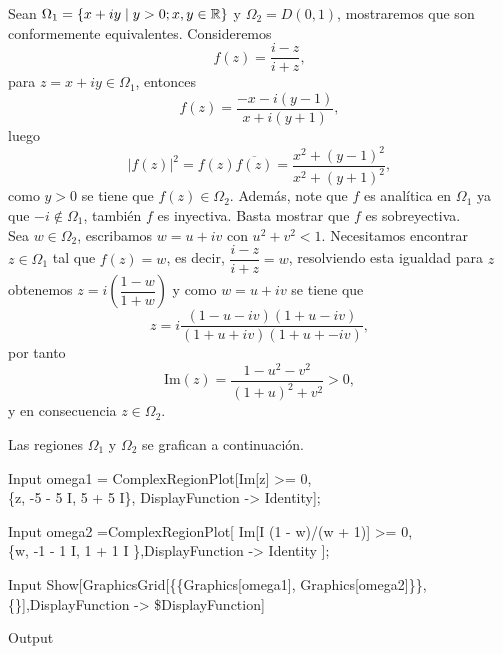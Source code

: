 
\begin{Ejem}\label{ejemplo1}
	Sean $\Omega_{1}=\{x+iy\mid y>0;x,y\in \mathbb{R}\}$ y $\Omega_{2}=D(0,1)$, mostraremos que son conformemente equivalentes. Consideremos 
	$$f(z)=\dfrac{i-z}{i+z},$$
	para $z=x+iy\in\Omega_{1}$, entonces 
	$$f(z)=\dfrac{-x-i(y-1)}{x+i(y+1)},$$
	luego
	$$|f(z)|^2=f(z)\overline{f(z)}=\dfrac{x^2+(y-1)^2}{x^2+(y+1)^2},$$
	como $y>0$ se tiene que $f(z)\in\Omega_{2}$. Además, note que $f$ es analítica en $\Omega_{1}$ ya que $-i\notin\Omega_{1}$, también $f$ es inyectiva. Basta mostrar que $f$ es sobreyectiva.\\
	Sea $w\in\Omega_{2}$, escribamos $w=u+iv$ con $u^2+v^2<1$. Necesitamos encontrar $z\in\Omega_{1}$ tal que $f(z)=w$, es decir, $\dfrac{i-z}{i+z}=w$, resolviendo esta igualdad para $z$ obtenemos $z=i\left(\dfrac{1-w}{1+w}\right)$ y como $w=u+iv$ se tiene que 
	$$z=i\dfrac{(1-u-iv)(1+u-iv)}{(1+u+iv)(1+u+-iv)},$$
	por tanto $$\mbox{Im}(z)=\dfrac{1-u^2-v^2}{(1+u)^2+v^2}>0,$$
	y en consecuencia $z\in\Omega_{2}$.
\end{Ejem}
Las regiones $\Omega_{1}$ y $\Omega_{2}$ se grafican a continuación.
\begin{mmaCell}{Input}
	 omega1 = ComplexRegionPlot[Im[z] >= 0,\\ \{z, -5 - 5 I, 5 + 5 I\}, DisplayFunction -> Identity];
\end{mmaCell}

\begin{mmaCell}{Input}
	 omega2 =ComplexRegionPlot[ Im[I (1 - w)/(w + 1)] >= 0, \\ \{w, -1 - 1 I, 1 + 1 I \},DisplayFunction -> Identity ];
\end{mmaCell}

\begin{mmaCell}{Input}
	 Show[GraphicsGrid[\{\{Graphics[omega1], Graphics[omega2]\}\}, \\\{\}],DisplayFunction -> \$DisplayFunction]
\end{mmaCell}

\begin{mmaCell}[moregraphics={moreig={scale=0.6}}]{Output}
\end{mmaCell}

